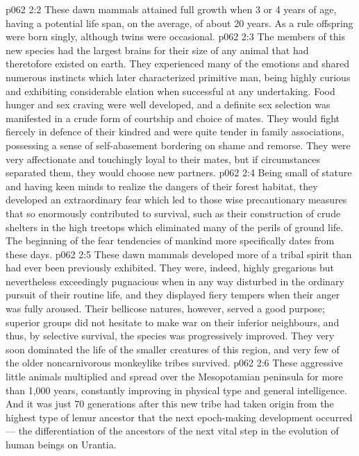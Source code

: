 \vs p062 2:2 These dawn mammals attained full growth when 3 or 4 years of age, having a potential life span, on the average, of about 20 years. As a rule offspring were born singly, although twins were occasional.
\vs p062 2:3 The members of this new species had the largest brains for their size of any animal that had theretofore existed on earth. They experienced many of the emotions and shared numerous instincts which later characterized primitive man, being highly curious and exhibiting considerable elation when successful at any undertaking. Food hunger and sex craving were well developed, and a definite sex selection was manifested in a crude form of courtship and choice of mates. They would fight fiercely in defence of their kindred and were quite tender in family associations, possessing a sense of self\hyp{}abasement bordering on shame and remorse. They were very affectionate and touchingly loyal to their mates, but if circumstances separated them, they would choose new partners.
\vs p062 2:4 Being small of stature and having keen minds to realize the dangers of their forest habitat, they developed an extraordinary fear which led to those wise precautionary measures that so enormously contributed to survival, such as their construction of crude shelters in the high treetops which eliminated many of the perils of ground life. The beginning of the fear tendencies of mankind more specifically dates from these days.
\vs p062 2:5 These dawn mammals developed more of a tribal spirit than had ever been previously exhibited. They were, indeed, highly gregarious but nevertheless exceedingly pugnacious when in any way disturbed in the ordinary pursuit of their routine life, and they displayed fiery tempers when their anger was fully aroused. Their bellicose natures, however, served a good purpose; superior groups did not hesitate to make war on their inferior neighbours, and thus, by selective survival, the species was progressively improved. They very soon dominated the life of the smaller creatures of this region, and very few of the older noncarnivorous monkeylike tribes survived.
\vs p062 2:6 These aggressive little animals multiplied and spread over the Mesopotamian peninsula for more than 1,000 years, constantly improving in physical type and general intelligence. And it was just 70 generations after this new tribe had taken origin from the highest type of lemur ancestor that the next epoch\hyp{}making development occurred --- the  differentiation of the ancestors of the next vital step in the evolution of human beings on Urantia.
